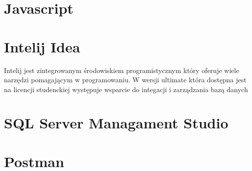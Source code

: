 \section{Javascript}

\section{Intelij Idea}
Intelij jest zintegrowanym środowiskiem programistycznym który oferuje wiele narzędzi pomagającym w programowaniu. W wersji ultimate która dostępna jest na licencji studenckiej występuje wsparcie do integacji i zarządzania bazą danych

\section{SQL Server Managament Studio}

\section{Postman}




